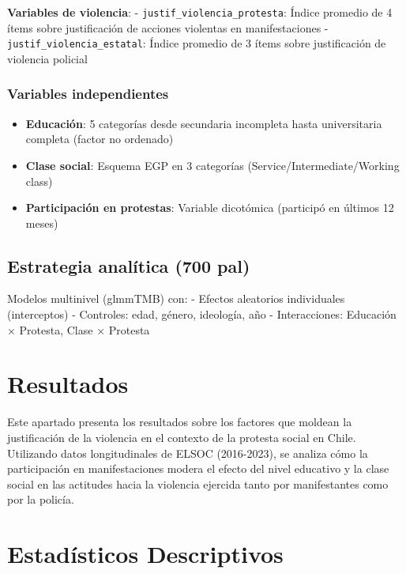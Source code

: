 \documentclass[
  12pt,
]{article}
\providecommand{\tightlist}{%
  \setlength{\itemsep}{0pt}\setlength{\parskip}{0pt}}
\begin{document}
\textbf{Variables de violencia}: - \texttt{justif\_violencia\_protesta}:
Índice promedio de 4 ítems sobre justificación de acciones violentas en
manifestaciones - \texttt{justif\_violencia\_estatal}: Índice promedio
de 3 ítems sobre justificación de violencia policial

\subsubsection{Variables independientes}\label{variables-independientes}

\begin{itemize}
\tightlist
\item
  \textbf{Educación}: 5 categorías desde secundaria incompleta hasta
  universitaria completa (factor no ordenado)
\item
  \textbf{Clase social}: Esquema EGP en 3 categorías
  (Service/Intermediate/Working class)
\item
  \textbf{Participación en protestas}: Variable dicotómica (participó en
  últimos 12 meses)
\end{itemize}

\subsection{Estrategia analítica (700
pal)}\label{estrategia-analuxedtica-700-pal}

Modelos multinivel (glmmTMB) con: - Efectos aleatorios individuales
(interceptos) - Controles: edad, género, ideología, año - Interacciones:
Educación × Protesta, Clase × Protesta

\section{Resultados}\label{resultados}

Este apartado presenta los resultados sobre los factores que moldean la
justificación de la violencia en el contexto de la protesta social en
Chile. Utilizando datos longitudinales de ELSOC (2016-2023), se analiza
cómo la participación en manifestaciones modera el efecto del nivel
educativo y la clase social en las actitudes hacia la violencia ejercida
tanto por manifestantes como por la policía.

\section{Estadísticos Descriptivos}\label{estaduxedsticos-descriptivos}
\end{document}
